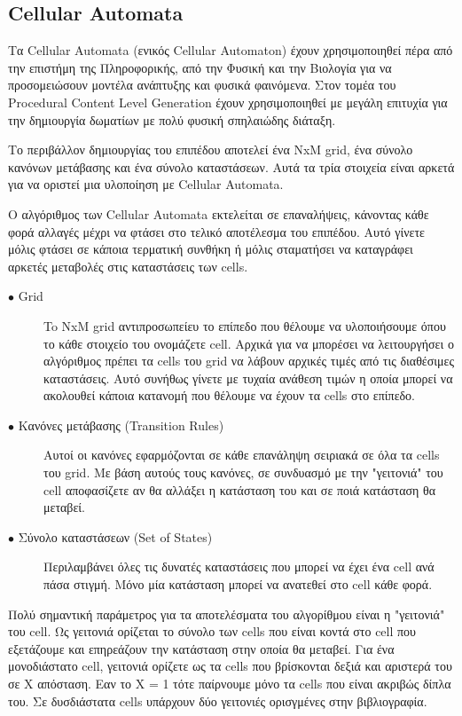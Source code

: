 \subsection{Cellular Automata}
Τα Cellular Automata (ενικός Cellular Automaton) έχουν χρησιμοποιηθεί πέρα από την επιστήμη της Πληροφορικής, από την Φυσική και την Βιολογία για να προσομειώσουν μοντέλα ανάπτυξης και φυσικά φαινόμενα. Στον τομέα του Procedural Content Level Generation έχουν χρησιμοποιηθεί με μεγάλη επιτυχία για την δημιουργία δωματίων με πολύ φυσική σπηλαιώδης διάταξη.
\par
Το περιβάλλον δημιουργίας του επιπέδου αποτελεί ένα NxM grid, ένα σύνολο κανόνων μετάβασης και ένα σύνολο καταστάσεων. Αυτά τα τρία στοιχεία είναι αρκετά για να οριστεί μια υλοποίηση με Cellular Automata. 
\par
 Ο αλγόριθμος των Cellular Automata εκτελείται σε επαναλήψεις, κάνοντας κάθε φορά αλλαγές μέχρι να φτάσει στο τελικό αποτέλεσμα του επιπέδου. Αυτό γίνετε μόλις φτάσει σε κάποια τερματική συνθήκη ή μόλις σταματήσει να καταγράφει αρκετές μεταβολές στις καταστάσεις των cells.
\begin{description}
  \item[$\bullet$ Grid] To NxM grid αντιπροσωπείευ το επίπεδο που θέλουμε να υλοποιήσουμε όπου το κάθε στοιχείο του ονομάζετε cell. Αρχικά για να μπορέσει να λειτουργήσει ο αλγόριθμος πρέπει τα cells του grid να λάβουν αρχικές τιμές από τις διαθέσιμες καταστάσεις. Αυτό συνήθως γίνετε με τυχαία ανάθεση τιμών η οποία μπορεί να ακολουθεί κάποια κατανομή που θέλουμε να έχουν τα cells στο επίπεδο.
  \item[$\bullet$ Κανόνες μετάβασης (Transition Rules)] Αυτοί οι κανόνες εφαρμόζονται σε κάθε επανάληψη σειριακά σε όλα τα cells του grid. Με βάση αυτούς τους κανόνες, σε συνδυασμό με την "γειτονιά" του cell αποφασίζετε αν θα αλλάξει η κατάσταση του και σε ποιά κατάσταση θα μεταβεί.
    \item[$\bullet$ Σύνολο καταστάσεων (Set of States)] Περιλαμβάνει όλες τις δυνατές καταστάσεις που μπορεί να έχει ένα cell ανά πάσα στιγμή. Μόνο μία κατάσταση μπορεί να ανατεθεί στο cell κάθε φορά.
\end{description}
\par
Πολύ σημαντική παράμετρος για τα αποτελέσματα του αλγορίθμου είναι η "γειτονιά" του cell. Ως γειτονιά ορίζεται το σύνολο των cells που είναι κοντά στο cell που εξετάζουμε και επηρεάζουν την κατάσταση στην οποία θα μεταβεί. Για ένα μονοδιάστατο cell, γειτονιά ορίζετε ως τα cells που βρίσκονται δεξιά και αριστερά του σε X απόσταση. Εαν το X = 1 τότε παίρνουμε μόνο τα cells που είναι ακριβώς δίπλα του. Σε δυσδιάστατα cells υπάρχουν δύο γειτονιές ορισγμένες στην βιβλιογραφία.
